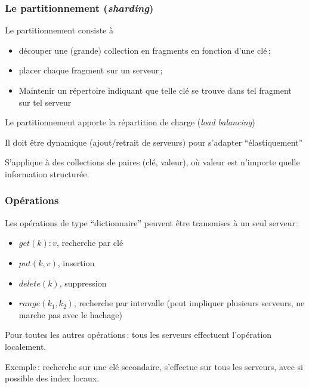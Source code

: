 
\begin{frame}
\frametitle{Le partitionnement (\textit{sharding})}

Le partitionnement consiste à  

\begin{itemize}
  \item \alert{découper} une (grande) collection
      en \alert{fragments} en fonction d'une \alert{clé}\,;
      \item placer chaque fragment sur un \alert{serveur}\,;
      \item Maintenir un \alert{répertoire} indiquant  que telle \alert{clé} se trouve dans tel \alert{fragment}
          sur tel \alert{serveur}
\end{itemize}
 
\vfill

Le partitionnement apporte la \alert{répartition de charge} (\textit{load balancing})

\vfill

Il doit être \alert{dynamique} (ajout/retrait de serveurs) pour s'adapter ``élastiquement'' 
 
 \vfill
 
 S'applique à des collections de paires (clé, valeur), où valeur est n'importe quelle information structurée.
\end{frame}

\begin{frame}
\frametitle{Opérations}

Les opérations de type ``dictionnaire'' peuvent être transmises à \alert{un seul} serveur\,:

\begin{itemize}
   \item $get(k): v$, recherche par clé
   \item $put (k, v)$, insertion
   \item $delete(k)$, suppression
   \item $range(k_1, k_2)$, recherche par intervalle (peut impliquer plusieurs serveurs, ne marche pas avec le hachage)
\end{itemize}

\vfill

\alert{Pour toutes les autres opérations}\,: tous les serveurs effectuent l'opération localement.

\vfill

Exemple\,: recherche sur une clé secondaire, s'effectue sur \alert{tous} les serveurs, avec si possible des index locaux.
\end{frame}

